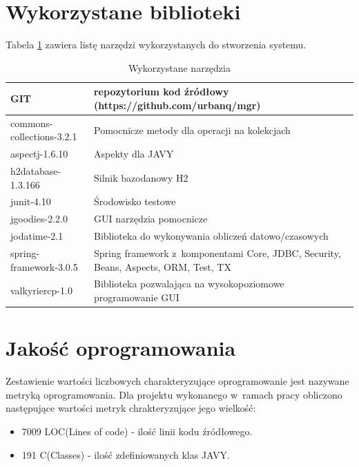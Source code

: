 \section{Wykorzystane biblioteki}
\label{sec:wykorzystaneBiblioteki}
Tabela \ref{tab:tools} zawiera listę narzędzi wykorzystanych do stworzenia systemu.
\begin{table}[h]
 \caption{Wykorzystane narzędzia}
 \small
 \selectfont
 \centering
 \vspace{0in}
 \begin{tabular}{|l|p{7cm}|}
 \hline
 GIT & repozytorium kod źródłowy (https://github.com/urbanq/mgr) \\
 \hline
 commons-collections-3.2.1 & Pomocnicze metody dla operacji na kolekcjach \\
 \hline
 aspectj-1.6.10 & Aspekty dla JAVY \\
 \hline
 h2database-1.3.166 & Silnik bazodanowy H2 \\
 \hline
 junit-4.10 & Środowisko testowe \\
 \hline
 jgoodies-2.2.0 & GUI narzędzia pomocnicze \\
 \hline
 jodatime-2.1 & Biblioteka do wykonywania obliczeń datowo/czasowych \\
 \hline
 spring-framework-3.0.5 & Spring framework z~komponentami Core, JDBC, Security, Beans, Aspects, ORM, Test, TX \\
 \hline
 valkyriercp-1.0 & Biblioteka pozwalająca na wysokopoziomowe programowanie GUI \\
 \hline
 \end{tabular}
 \label{tab:tools}
\end{table}


\section{Jakość oprogramowania}
\label{sec:jakoscOprogramowania}

Zestawienie wartości liczbowych charakteryzujące oprogramowanie jest nazywane metryką oprogramowania. Dla projektu wykonanego w~ramach pracy obliczono następujące wartości metryk chrakteryzujące jego wielkość:
\begin{itemize}
 \item 7009 LOC(Lines of code) - ilość linii kodu źródłowego.
 \item 191 C(Classes) - ilość zdefiniowanych klas JAVY.
\end{itemize}

